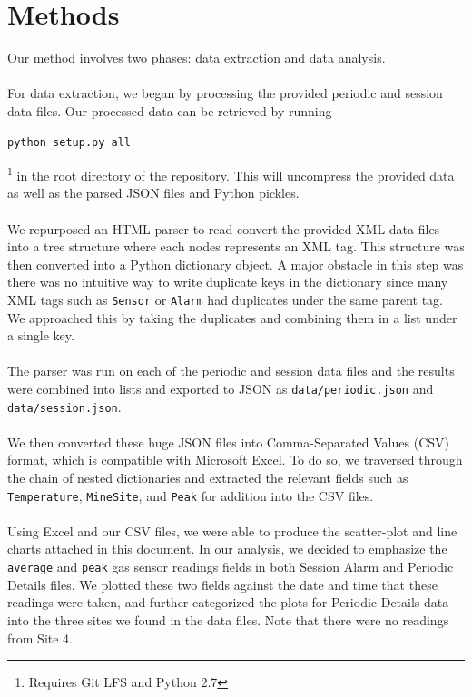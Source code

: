 \documentclass[twoside,twocolumn]{article}
\begin{document}

\section{Methods}

Our method involves two phases: data extraction and data analysis.\\\\
For data extraction, we began by processing the provided periodic and session data files. Our processed data can be retrieved by running
\begin{verbatim}
python setup.py all
\end{verbatim}\footnote{Requires Git LFS and Python 2.7}
in the root directory of the repository. This will uncompress the provided data as well as the parsed JSON files and Python pickles.\\\\
We repurposed an HTML parser to read convert the provided XML data files into a tree structure where each nodes represents an XML tag. This structure was then converted into a Python dictionary object. A major obstacle in this step was there was no intuitive way to write duplicate keys in the dictionary since many XML tags such as \texttt{Sensor} or \texttt{Alarm} had duplicates under the same parent tag. We approached this by taking the duplicates and combining them in a list under a single key.\\\\
The parser was run on each of the periodic and session data files and the results were combined into lists and exported to JSON as \texttt{data/periodic.json} and \texttt{data/session.json}.\\\\
We then converted these huge JSON files into Comma-Separated Values (CSV) format, which is compatible with Microsoft Excel. To do so, we traversed through the chain of nested dictionaries and extracted the relevant fields such as \texttt{Temperature}, \texttt{MineSite}, and \texttt{Peak} for addition into the CSV files.\\\\
Using Excel and our CSV files, we were able to produce the scatter-plot and line charts attached in this document. In our analysis, we decided to emphasize the \texttt{average} and \texttt{peak} gas sensor readings fields in both Session Alarm and Periodic Details files. We plotted these two fields against the date and time that these readings were taken, and further categorized the plots for Periodic Details data into the three sites we found in the data files. Note that there were no readings from Site 4.
\end{document}
